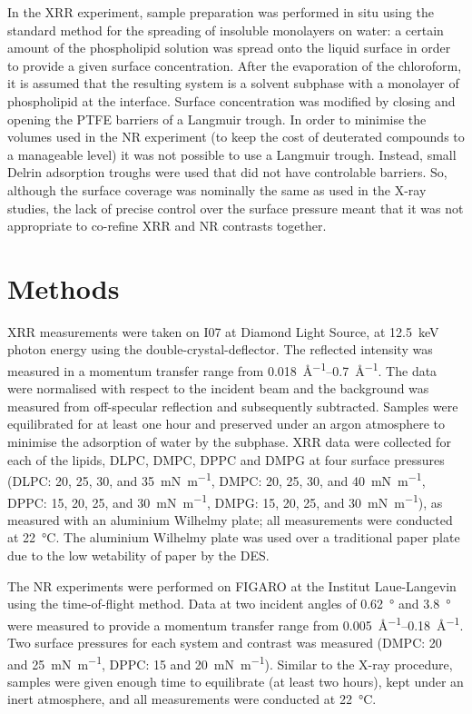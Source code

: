 \documentclass[11pt,a4paper]{article}
\begin{document}
In the XRR experiment, sample preparation was performed in situ using the standard method for the spreading of insoluble monolayers on water: a certain amount of the phospholipid solution was spread onto the liquid surface in order to provide a given surface concentration. After the evaporation of the chloroform, it is assumed that the resulting system is a solvent subphase with a monolayer of phospholipid at the interface. Surface concentration was modified by closing and opening the PTFE barriers of a Langmuir trough. In order to minimise the volumes used in the NR experiment (to keep the cost of deuterated compounds to a manageable level) it was not possible to use a Langmuir trough. Instead, small Delrin adsorption troughs were used that did not have controlable barriers. So, although the surface coverage was nominally the same as used in the X-ray studies, the lack of precise control over the surface pressure meant that it was not appropriate to co-refine XRR and NR contrasts together.

\section{Methods}
XRR measurements were taken on I07 at Diamond Light Source, at \SI{12.5}{\kilo\eV} photon energy using the double-crystal-deflector.\cite{Arnold2012} The reflected intensity was measured in a momentum transfer range from \SIrange{0.018}{0.7}{\AA^{-1}}. The data were normalised with respect to the incident beam and the background was measured from off-specular reflection and subsequently subtracted. Samples were equilibrated for at least one hour and preserved under an argon atmosphere to minimise the adsorption of water by the subphase. XRR data were collected for each of the lipids, DLPC, DMPC, DPPC and DMPG at four surface pressures (DLPC: 20, 25, 30, and \SI{35}{\milli\newton\meter^{-1}}, DMPC: 20, 25, 30, and \SI{40}{\milli\newton\meter^{-1}}, DPPC: 15, 20, 25, and \SI{30}{\milli\newton\meter^{-1}}, DMPG: 15, 20, 25, and \SI{30}{\milli\newton\meter^{-1}}), as measured with an aluminium Wilhelmy plate; all measurements were conducted at \SI{22}{\celsius}. The aluminium Wilhelmy plate was used over a traditional paper plate due to the low wetability of paper by the DES.

The NR experiments were performed on FIGARO at the Institut Laue-Langevin using the time-of-flight method.\cite{Campbell2011} Data at two incident angles of \SI{0.62}{\degree} and \SI{3.8}{\degree} were measured to provide a momentum transfer range from \SIrange{0.005}{0.18}{\AA^{-1}}. Two surface pressures for each system and contrast was measured (DMPC: 20 and \SI{25}{\milli\newton\meter^{-1}}, DPPC: 15 and \SI{20}{\milli\newton\meter^{-1}}). Similar to the X-ray procedure, samples were given enough time to equilibrate (at least two hours), kept under an inert atmosphere, and all measurements were conducted at \SI{22}{\celsius}.
\end{document}
